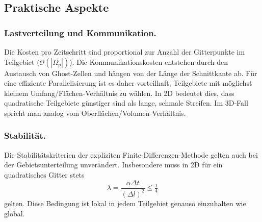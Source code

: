 \subsection{Praktische Aspekte}

\subsubsection {Lastverteilung und Kommunikation.}
Die Kosten pro Zeitschritt sind proportional zur Anzahl der Gitterpunkte im Teilgebiet 
($\mathcal{O}(|\Omega_p|)$).  
Die Kommunikationskosten entstehen durch den Austausch von Ghost-Zellen und hängen von der Länge der Schnittkante ab.  
Für eine effiziente Parallelisierung ist es daher vorteilhaft, Teilgebiete mit möglichst kleinem 
Umfang/Flächen-Verhältnis zu wählen.  
In 2D bedeutet dies, dass quadratische Teilgebiete günstiger sind als lange, schmale Streifen.
Im 3D-Fall spricht man analog vom Oberflächen/Volumen-Verhältnis.  

\subsubsection {Stabilität.}
Die Stabilitätskriterien der expliziten Finite-Differenzen-Methode gelten auch bei der Gebietsunterteilung unverändert.  
Insbesondere muss in 2D für ein quadratisches Gitter stets
\[
\lambda = \frac{\alpha \Delta t}{(\Delta l)^2} \leq \tfrac{1}{4}
\]
gelten.  
Diese Bedingung ist lokal in jedem Teilgebiet genauso einzuhalten wie global.  




